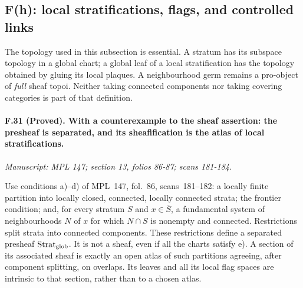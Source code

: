 \subsection{F(h): local stratifications, flags, and controlled links}

The topology used in this subsection is essential. A stratum has its
subspace topology in a global chart; a global leaf of a local
stratification has the topology obtained by gluing its local plaques.
A neighbourhood germ remains a pro-object of \emph{full} sheaf topoi.
Neither taking connected components nor taking covering categories is
part of that definition.

\paragraph{F.31 (Proved). With a counterexample to the sheaf assertion:
the presheaf is separated, and its sheafification is the atlas of local
stratifications.}
\textit{Manuscript: MPL 147; section 13, folios 86-87; scans 181-184.}

Use conditions a)--d) of MPL~147, fol.~86, scans~181--182: a locally
finite partition into locally closed, connected, locally connected strata;
the frontier condition; and, for every stratum $S$ and $x\in\overline S$,
a fundamental system of neighbourhoods $N$ of $x$ for which $N\cap S$
is nonempty and connected. Restrictions split strata into connected
components. These restrictions define a separated presheaf
$\operatorname{Strat}_{\rm glob}$. It is not a sheaf, even if all the
charts satisfy e). A section of its associated sheaf is exactly an open
atlas of such partitions agreeing, after component splitting, on
overlaps. Its leaves and all its local flag spaces are intrinsic to that
section, rather than to a chosen atlas.

